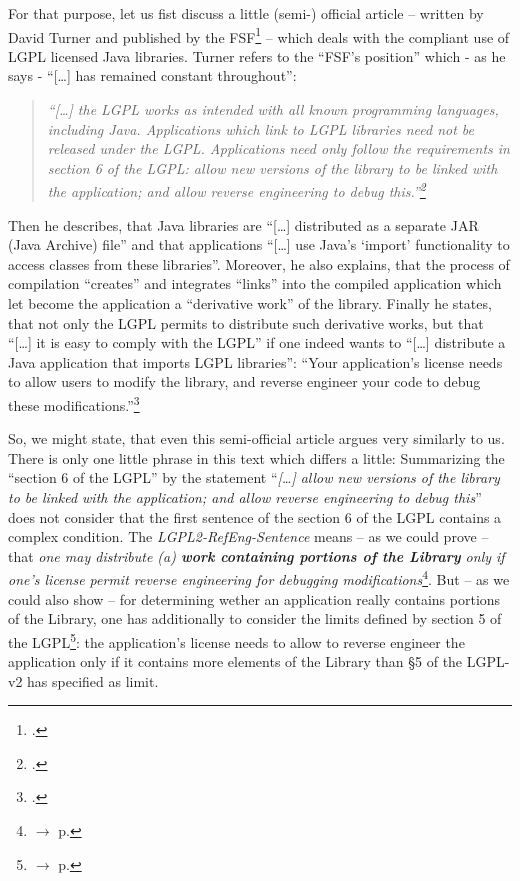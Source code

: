 For that purpose, let us fist discuss a little (semi-) official article --
written by David Turner and published by the FSF\footcite[cf.][\nopage
wp.]{Turner2004a} -- which deals with the compliant use of LGPL licensed Java
libraries. Turner refers to the \enquote{FSF's position} which - as he says -
\enquote{[\ldots] has remained constant throughout}:

\begin{quote}\noindent\emph{\enquote{[\ldots] the LGPL works as intended with
all known programming languages, including Java. Applications which link to LGPL
libraries need not be released under the LGPL. Applications need only follow the
requirements in section 6 of the LGPL: allow new versions of the library to be
linked with the application; and allow reverse engineering to debug
this.}\footcite[cf.][\nopage wp]{Turner2004a}}\end{quote}

Then he describes, that Java libraries are \enquote{[\ldots] distributed as a
separate JAR (Java Archive) file} and that applications \enquote{[\ldots] use
Java's \enquote{import} functionality to access classes from these libraries}.
Moreover, he also explains, that the process of compilation \enquote{creates}
and integrates \enquote{links} into the compiled application which let become
the application a \enquote{derivative work} of the library.
Finally he states, that not only the LGPL permits to distribute such derivative
works, but that \enquote{[\ldots] it is easy to comply with the LGPL} if one
indeed wants to \enquote{[\ldots] distribute a Java application that imports
LGPL libraries}: \enquote{Your application's license needs to allow users to
modify the library, and reverse engineer your code to debug these
modifications.}\footcite[cf.][\nopage wp.]{Turner2004a}

So, we might state, that even this semi-official article argues very similarly
to us. There is only one little phrase in this text which differs a little:
Summarizing the \enquote{section 6 of the LGPL} by the statement
\enquote{\emph{[\ldots] allow new versions of the library to be linked with the
application; and allow reverse engineering to debug this}} does not consider
that the first sentence of the section 6 of the LGPL contains a complex
condition. The \emph{LGPL2-RefEng-Sentence} means -- as we could prove -- that
\emph{one may distribute (a) \textbf{work containing portions of the Library}
only if one's license permit reverse engineering for debugging
modifications}\footnote{$\rightarrow$ p.
\pageref{RevEngEssentialLgplSection6Meaning}}. But -- as we could also show --
for determining wether an application really contains portions of the Library,
one has additionally to consider the limits defined by section 5 of the
LGPL\footnote{$\rightarrow$ p. \pageref{RevEngLgplSection5Derivation}}: the 
application's license needs to allow to reverse engineer the application only if
it contains more elements of the Library than §5 of the LGPL-v2 has specified as
limit.

